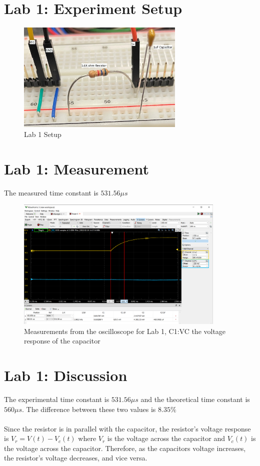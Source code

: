 \documentclass[12pt]{article}
\begin{document}
\section*{Lab 1: Experiment Setup}
\begin{figure}[h]
\includegraphics[width=8cm]{Lab1}
\centering
\caption{Lab 1 Setup}
\end{figure}
\section*{Lab 1: Measurement}
The measured time constant is $531.56\mu s$
\begin{figure}[h]
\includegraphics[width=10cm]{Problem 1 Fig}
\centering
\caption{Measurements from the oscilloscope for Lab 1, C1:VC the voltage response of the capacitor}
\end{figure}
\section*{Lab 1: Discussion}

The experimental time constant is $531.56\mu s$ and the theoretical time constant is $560\mu s$. The difference between these two values is $8.35\%$
\\\\
Since the resistor is in parallel with the capacitor, the resistor's voltage response is $V_r=V(t)-V_c(t)$ where $V_r$ is the voltage across the capacitor and $V_c(t)$ is the voltage across the capacitor. Therefore, as the capacitors voltage increases, the resistor's voltage decreases, and vice versa. 
\\\\
\end{document}
